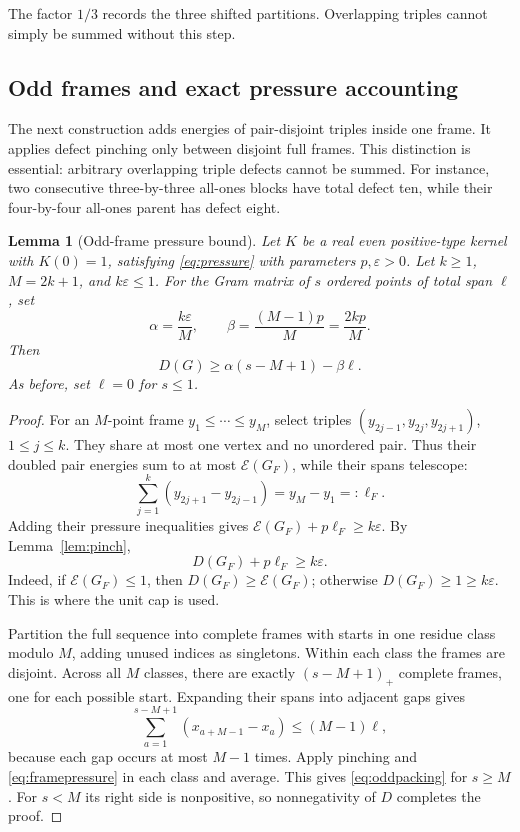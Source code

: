 ﻿\documentclass[11pt]{article}
\newtheorem{lemma}[theorem]{Lemma}
\theoremstyle{remark}
\newcommand{\cE}{\mathcal E}
\begin{document}
The factor $1/3$ records the three shifted partitions. Overlapping triples
cannot simply be summed without this step.

\subsection{Odd frames and exact pressure accounting}

The next construction adds energies of pair-disjoint triples inside one
frame. It applies defect pinching only between disjoint full frames. This
distinction is essential: arbitrary overlapping triple defects cannot be
summed. For instance, two consecutive three-by-three all-ones blocks have
total defect ten, while their four-by-four all-ones parent has defect eight.

\begin{lemma}[Odd-frame pressure bound]\label{lem:oddframe}
Let $K$ be a real even positive-type kernel with $K(0)=1$, satisfying
\eqref{eq:pressure} with parameters $p,\varepsilon>0$. Let $k\ge1$,
$M=2k+1$, and $k\varepsilon\le1$. For the Gram matrix of $s$ ordered
points of total span $\ell$, set
\[
 \alpha=\frac{k\varepsilon}{M},\qquad
 \beta=\frac{(M-1)p}{M}=\frac{2kp}{M}.
\]
Then
\begin{equation}\label{eq:oddpacking}
 D(G)\ge\alpha(s-M+1)-\beta\ell.
\end{equation}
As before, set $\ell=0$ for $s\le1$.
\end{lemma}
\begin{proof}
For an $M$-point frame $y_1\le\cdots\le y_M$, select triples
$(y_{2j-1},y_{2j},y_{2j+1})$, $1\le j\le k$. They share at most one
vertex and no unordered pair. Thus their doubled pair energies sum to at
most $\cE(G_F)$, while their spans telescope:
\[
 \sum_{j=1}^k(y_{2j+1}-y_{2j-1})=y_M-y_1=:\ell_F.
\]
Adding their pressure inequalities gives
$\cE(G_F)+p\ell_F\ge k\varepsilon$. By Lemma~\ref{lem:pinch},
\begin{equation}\label{eq:framepressure}
 D(G_F)+p\ell_F\ge k\varepsilon.
\end{equation}
Indeed, if $\cE(G_F)\le1$, then $D(G_F)\ge\cE(G_F)$; otherwise
$D(G_F)\ge1\ge k\varepsilon$. This is where the unit cap is used.

Partition the full sequence into complete frames with starts in one
residue class modulo $M$, adding unused indices as singletons. Within
each class the frames are disjoint. Across all $M$ classes, there are
exactly $(s-M+1)_+$ complete frames, one for each possible start. Expanding
their spans into adjacent gaps gives
\[
 \sum_{a=1}^{s-M+1}(x_{a+M-1}-x_a)\le(M-1)\ell,
\]
because each gap occurs at most $M-1$ times. Apply pinching and
\eqref{eq:framepressure} in each class and average. This gives
\eqref{eq:oddpacking} for $s\ge M$. For $s<M$ its right side is
nonpositive, so nonnegativity of $D$ completes the proof.
\end{proof}
\end{document}
